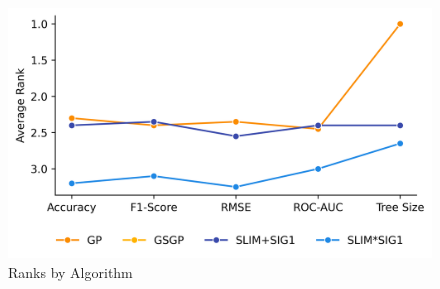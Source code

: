 
    \begin{figure}[H]
    \centering
    \includegraphics[width=\linewidth]{../Latex/Chapters/Figures/Results/comparison_test_ranks.png}
    \caption{Ranks by Algorithm}
    \label{fig:comparison_test_ranks}
    \end{figure}
    